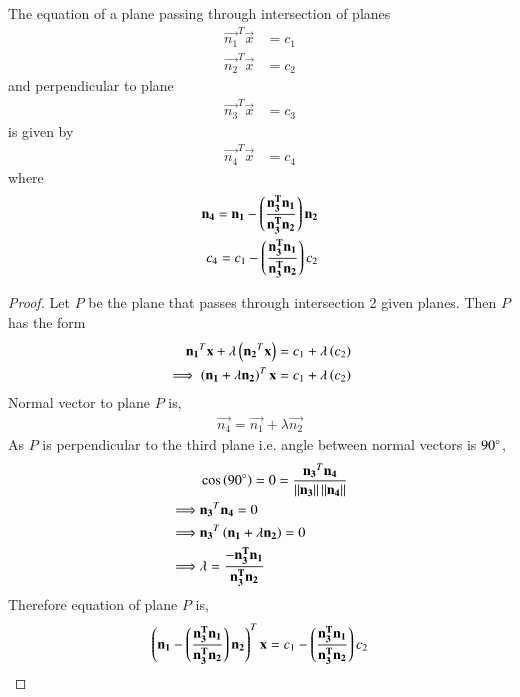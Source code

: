 \begin{lemma}
   The equation of a plane passing through intersection of planes
   \begin{align}
    \vec{n_{1}}^T\vec{x}&=c_{1}\\ \vec{n_{2}}^T\vec{x}&=c_{2}
   \end{align}
   and perpendicular to plane
   \begin{align}
     \vec{n_{3}}^T\vec{x}&=c_{3}
   \end{align}
   is given by 
   \begin{align}
      \vec{n_{4}}^T\vec{x}&=c_{4}
   \end{align}
   where 
   \begin{align}
       \mathbf{n_{4}} = \mathbf{n_{1}} - \left(\frac{\mathbf{n_{3}^T\mathbf{n_1}}}{\mathbf{n_{3}^T\mathbf{n_2}}}\right)\mathbf{n_2}\\
       c_{4} = c_{1} - \left(\frac{\mathbf{n_{3}^T\mathbf{n_1}}}{\mathbf{n_{3}^T\mathbf{n_2}}}\right)c_{2}
   \end{align}
\end{lemma}
\begin{proof}
   Let $P$ be the plane that passes through intersection 2 given planes. Then $P$ has the form
   \begin{align}
       \mathbf{n_{1}}^T\mathbf{x} + \lambda\left(\mathbf{n_{2}}^T\mathbf{x}\right) = c_{1} + \lambda\left(c_{2}\right)\\
       \implies \left(\mathbf{n_{1}}+\lambda\mathbf{n_{2}}\right)^T\mathbf{x} = c_{1} + \lambda\left(c_{2}\right)
   \end{align}
  Normal vector to plane $P$ is,
 \begin{align}
     \vec{n_{4}} = \vec{n_{1}}+\lambda\vec{n_{2}}
 \end{align}
 As $P$ is perpendicular to the third plane i.e. angle between normal vectors is $90\degree$, 
 \begin{align}
     &\cos\left(90\degree\right) = 0 = \dfrac{\mathbf{n_{3}}^T\mathbf{n_{4}}}{\left\lVert\mathbf{n_{3}}\right\rVert\left\lVert\mathbf{n_{4}}\right\rVert}\\
    \implies &\mathbf{n_{3}}^T\mathbf{n_{4}} = 0\\
    \implies &\mathbf{n_{3}}^T\left(\mathbf{n_{1}}+\lambda\mathbf{n_{2}}\right) = 0\\
    \implies &\lambda = \frac{-\mathbf{n_{3}^T\mathbf{n_1}}}{\mathbf{n_{3}^T\mathbf{n_2}}}
 \end{align}
 Therefore equation of plane $P$ is,
 \begin{align}
     \left(\mathbf{n_{1}} - \left(\frac{\mathbf{n_{3}^T\mathbf{n_1}}}{\mathbf{n_{3}^T\mathbf{n_2}}}\right)\mathbf{n_2}\right)^T\mathbf{x} = c_{1} - \left(\frac{\mathbf{n_{3}^T\mathbf{n_1}}}{\mathbf{n_{3}^T\mathbf{n_2}}}\right)c_{2}
 \end{align}
\end{proof}
